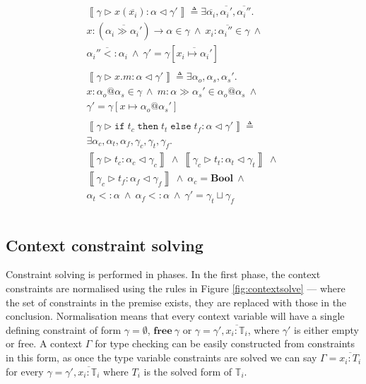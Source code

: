 \documentclass{article}
\newcommand{\figref}[1]{Figure \ref{#1}}
\newcommand{\inferrule}[4]{\left\llbracket #1 \triangleright #2 : #3 \triangleleft #4 \right\rrbracket}
\newcommand{\inferlhs}[1]{\left\llbracket \gamma \triangleright #1 : \alpha \triangleleft \gamma' \right\rrbracket}
\newcommand{\boolt}{\mathbf{Bool}}
\newcommand{\ift}[3]{\mathtt{if} \; #1 \; \mathtt{then} \; #2 \; \mathtt{else} \; #3}
\newcommand{\cand}{\:\wedge\:}
\newcommand{\free}[1]{\mathbf{free}\:#1}
\begin{document}
\[\begin{array}{l}
\inferlhs{x ( \overline{x_i} )} \triangleq
\exists \overline{\alpha_i}, \overline{\alpha_i'},\overline{\alpha_i''} . \\
x : ( \overline{\alpha_i \gg \alpha_i'} ) \rightarrow \alpha \in \gamma
\cand 
\overline{x_i : \alpha_i'' \in \gamma}
\cand
\\ 
\overline{\alpha_i'' <: \alpha_i}
\cand
\gamma' = \gamma [ \overline{x_i \mapsto \alpha_i'} ]
\\\\

\inferlhs{x.m} \triangleq
\exists \alpha_o, \alpha_s, \alpha_s' . \\
x : \alpha_o @ \alpha_s \in \gamma
\cand 
m : \alpha \gg \alpha_s' \in \alpha_o @ \alpha_s
\cand  \\
\gamma' = \gamma[ x \mapsto \alpha_o @ \alpha_s' ]
\\\\

\inferlhs{\ift{t_c}{t_t}{t_f}} \triangleq
\\
\exists \alpha_c, \alpha_t, \alpha_f, \gamma_c, \gamma_t, \gamma_f . \\
\inferrule{\gamma}{t_c}{\alpha_c}{\gamma_c}
\cand
\inferrule{\gamma_c}{t_t}{\alpha_t}{\gamma_t}
\cand 
\\
\inferrule{\gamma_c}{t_f}{\alpha_f}{\gamma_f}
\cand
\alpha_c = \boolt
\cand
\\
\alpha_t <: \alpha
\cand
\alpha_f <: \alpha
\cand
\gamma' = \gamma_t \sqcup \gamma_f
\\\\

\end{array}
\]

\subsection{Context constraint solving}

Constraint solving is performed in phases. In the first phase, the context 
constraints
are normalised using the rules in \figref{fig:contextsolve} --- where the set of 
constraints in the premise exists, they are replaced with those in the 
conclusion. Normalisation means that every context variable will have a single 
defining constraint of form $\gamma = \emptyset$, $\free{\gamma}$ or
$\gamma = \gamma', \overline{x_i : \mathbb{T}_i}$, where $\gamma'$ is
either empty or free. A context $\Gamma$ for type checking can be easily
constructed from constraints in this form, as once the type variable
constraints are solved we can say $\Gamma = \overline{x_i : T_i}$ for
every $\gamma = \gamma', \overline{x_i : \mathbb{T}_i}$ where $T_i$ is the
solved form of $\mathbb{T}_i$.
\end{document}
